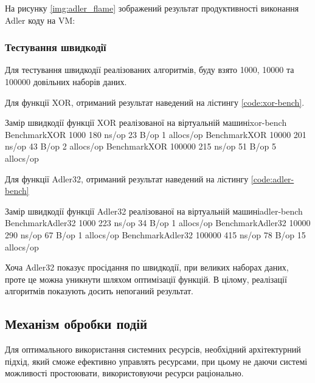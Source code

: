 \documentclass{lib/styles/default-style}
\begin{document}

    На рисунку \ref{img:adler_flame} зображений результат продуктивності виконання Adler коду на VM:

    
    \subsubsection{Тестування швидкодії}

    Для тестування швидкодії реалізованих алгоритмів, буду взято 1000, 10000 та 100000 довільних наборів даних.

    Для функції XOR, отриманий результат наведений на лістингу \ref{code:xor-bench}.
    
    \begin{stdout}{Замір швидкодії функції XOR реалізованої на віртуальній машині}{xor-bench}
        BenchmarkXOR     1000   180 ns/op  23 B/op  1 allocs/op
        BenchmarkXOR     10000  201 ns/op  43 B/op  2 allocs/op
        BenchmarkXOR     100000 215 ns/op  51 B/op  5 allocs/op\end{stdout}

    Для функції Adler32, отриманий результат наведений на лістингу \ref{code:adler-bench}

    \begin{stdout}{Замір швидкодії функції Adler32 реалізованої на віртуальній машині}{adler-bench}
        BenchmarkAdler32     1000   223 ns/op  34 B/op  1 allocs/op
        BenchmarkAdler32     10000  290 ns/op  67 B/op  1 allocs/op
        BenchmarkAdler32     100000 415 ns/op  78 B/op  15 allocs/op\end{stdout}
    
    Хоча Adler32 показує просідання по швидкодії, при великих наборах даних, проте це можна уникнути шляхом оптимізації функцій.
    В цілому, реалізації алгоритмів показують досить непоганий результат.

\subsection{Механізм обробки подій}

    Для оптимального використання системних ресурсів, необхідний архітектурний підхід, який сможе ефективно управлять ресурсами,
    при цьому не даючи системі можливості простоювати, використовуючи ресурси раціонально.
\end{document}
